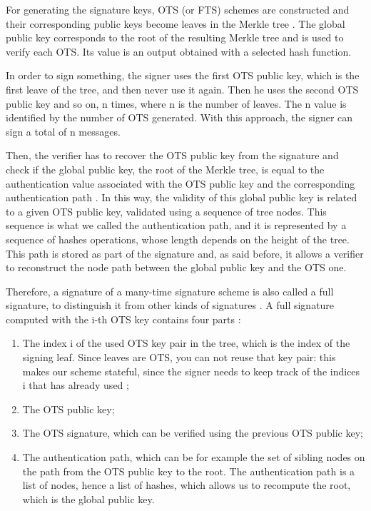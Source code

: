 \documentclass[a4paper,12pt]{article}
\begin{document}
For generating the signature keys, OTS (or FTS) schemes are constructed and their corresponding public keys become leaves in the Merkle tree \cite{5_postquantum_signature_usecase}. The global public key corresponds to the root of the resulting Merkle tree and is used to verify each OTS. Its value is an output obtained with a selected hash function.

In order to sign something, the signer uses the first OTS public key, which is the first leave of the tree, and then never use it again. Then he uses the second OTS public key and so on, n times, where n is the number of leaves. The n value is identified by the number of OTS generated. With this approach, the signer can sign a total of n messages.

Then, the verifier has to recover the OTS public key from the signature and check if the global public key, the root of the Merkle tree, is equal to the authentication value associated with the OTS public key and the corresponding authentication path \cite{13_faultattacks}. 
In this way, the validity of this global public key is related to a given OTS public key, validated using a sequence of tree nodes. This sequence is what we called the authentication path, and it is represented by a sequence of hashes operations, whose length depends on the height of the tree. This path is stored as part of the signature and, as said before, it allows a verifier to reconstruct the node path between the global public key and the OTS one.

Therefore, a signature of a many-time signature scheme is also called a full signature, to distinguish it from other kinds of signatures \cite{1_sphincspaper}. A full signature computed with the i-th OTS key contains four parts \cite{53_hbs}:
\begin{enumerate}
	\item The index i of the used OTS key pair in the tree, which is the index of the signing leaf. Since leaves are OTS, you can not reuse that key pair: this makes our scheme stateful, since the signer needs to keep track of the indices i that has already used \cite{7_hashbased};
	\item The OTS public key;
	\item The OTS signature, which can be verified using the previous OTS public key;
	\item The authentication path, which can be for example the set of sibling nodes on the path from the OTS public key to the root. The authentication path is a list of nodes, hence a list of hashes, which allows us to recompute the root, which is the global public key.
\end{enumerate}
\end{document}

